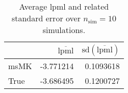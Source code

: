 \begin{table}[H]

\caption{Average lpml and related standard error over $n_{\text{sim}} = 10$ simulations.}
\centering
\begin{tabular}[t]{lrr}
\toprule
  & $\overbar{\text{lpml}}$ & $\text{sd}(\overbar{\text{lpml}})$\\
\midrule
msMK & -3.771214 & 0.1093618\\
True & -3.686495 & 0.1200727\\
\bottomrule
\end{tabular}
\end{table}